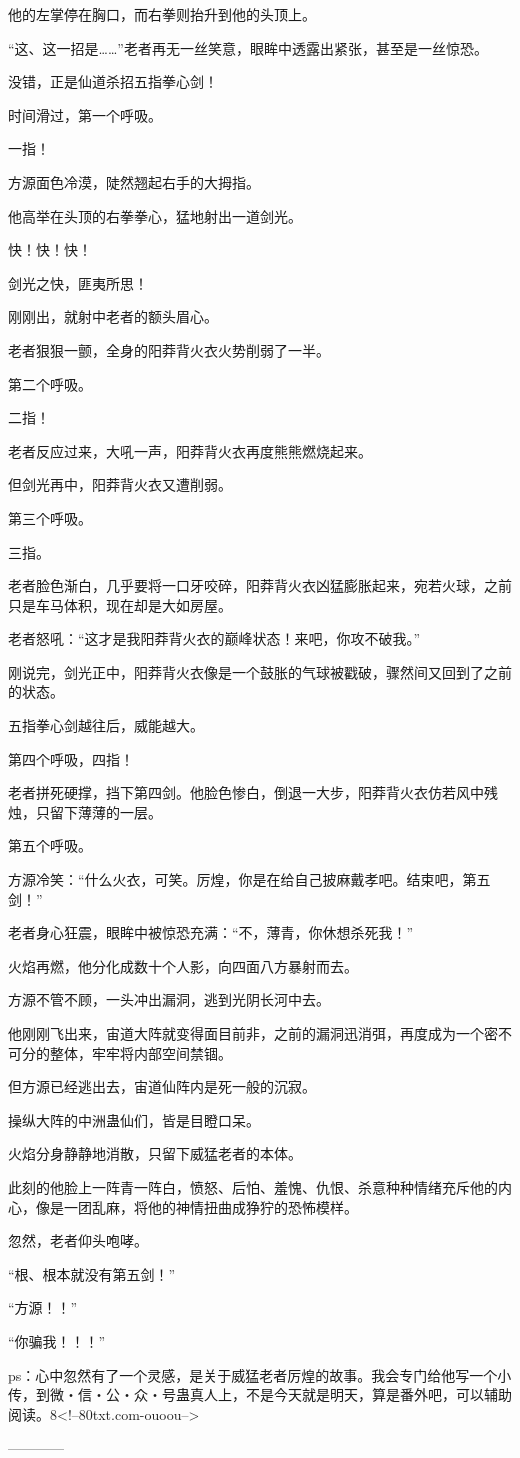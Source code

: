 \begin{this_body}
他的左掌停在胸口，而右拳则抬升到他的头顶上。

“这、这一招是……”老者再无一丝笑意，眼眸中透露出紧张，甚至是一丝惊恐。

没错，正是仙道杀招五指拳心剑！

时间滑过，第一个呼吸。

一指！

方源面色冷漠，陡然翘起右手的大拇指。

他高举在头顶的右拳拳心，猛地射出一道剑光。

快！快！快！

剑光之快，匪夷所思！

刚刚出，就射中老者的额头眉心。

老者狠狠一颤，全身的阳莽背火衣火势削弱了一半。

第二个呼吸。

二指！

老者反应过来，大吼一声，阳莽背火衣再度熊熊燃烧起来。

但剑光再中，阳莽背火衣又遭削弱。

第三个呼吸。

三指。

老者脸色渐白，几乎要将一口牙咬碎，阳莽背火衣凶猛膨胀起来，宛若火球，之前只是车马体积，现在却是大如房屋。

老者怒吼：“这才是我阳莽背火衣的巅峰状态！来吧，你攻不破我。”

刚说完，剑光正中，阳莽背火衣像是一个鼓胀的气球被戳破，骤然间又回到了之前的状态。

五指拳心剑越往后，威能越大。

第四个呼吸，四指！

老者拼死硬撑，挡下第四剑。他脸色惨白，倒退一大步，阳莽背火衣仿若风中残烛，只留下薄薄的一层。

第五个呼吸。

方源冷笑：“什么火衣，可笑。厉煌，你是在给自己披麻戴孝吧。结束吧，第五剑！”

老者身心狂震，眼眸中被惊恐充满：“不，薄青，你休想杀死我！”

火焰再燃，他分化成数十个人影，向四面八方暴射而去。

方源不管不顾，一头冲出漏洞，逃到光阴长河中去。

他刚刚飞出来，宙道大阵就变得面目前非，之前的漏洞迅消弭，再度成为一个密不可分的整体，牢牢将内部空间禁锢。

但方源已经逃出去，宙道仙阵内是死一般的沉寂。

操纵大阵的中洲蛊仙们，皆是目瞪口呆。

火焰分身静静地消散，只留下威猛老者的本体。

此刻的他脸上一阵青一阵白，愤怒、后怕、羞愧、仇恨、杀意种种情绪充斥他的内心，像是一团乱麻，将他的神情扭曲成狰狞的恐怖模样。

忽然，老者仰头咆哮。

“根、根本就没有第五剑！”

“方源！！”

“你骗我！！！”

ps：心中忽然有了一个灵感，是关于威猛老者厉煌的故事。我会专门给他写一个小传，到微・信・公・众・号蛊真人上，不是今天就是明天，算是番外吧，可以辅助阅读。8<!--80txt.com-ouoou-->

------------

\end{this_body}

